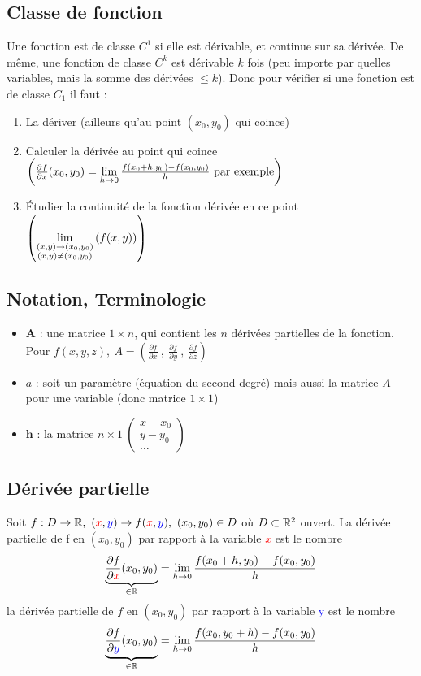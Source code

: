 \documentclass[12pt,a4paper]{article}
\renewcommand{\)}{\right)}
\renewcommand{\(}{\left(}
\begin{document}
\subsection{Classe de fonction}
Une fonction est de classe $C^1$ si elle est dérivable, et continue sur sa dérivée. De même, une fonction de classe $C^k$ est dérivable $k$ fois (peu importe par quelles variables, mais la somme des dérivées $\leq k$). Donc pour vérifier si une fonction est de classe $C_1$ il faut :
\begin{enumerate}
	\item	La dériver (ailleurs qu'au point $(x_0,y_0)$ qui coince)
	\item 	Calculer la dérivée au point qui coince $\(\frac{\partial f}{\partial x}(x_0,y_0) = \limite{h\to 0} \frac{f(x_0+h,y_0) - f(x_0,y_0)}{h}\text{ par exemple}\)$
	\item 	Étudier la continuité de la fonction dérivée en ce point $\(\llimite{(x,y) \to (x_0,y_0)}{(x,y) \neq (x_0,y_0)}{f(x,y)}\)$
\end{enumerate}
\subsection{Notation, Terminologie}
\begin{itemize}
	\item $\textbf{A}$ : une matrice $1\times n$, qui contient les $n$ dérivées partielles de la fonction. Pour $f(x,y,z),\ A = \(\frac{\partial f}{\partial x}\ ,\ \frac{\partial f}{\partial y}\ ,\ \frac{\partial f}{\partial z}\)$
	\item $a$ : soit un paramètre (équation du second degré) mais aussi la matrice $A$ pour une variable (donc matrice $1\times 1$)
	\item $\textbf{h}$ : la matrice $n\times 1\ \begin{pmatrix}
	x-x_0\\
	y-y_0\\
	\ldots
	\end{pmatrix}$
\end{itemize}
\subsection{Dérivée partielle}
\label{deriv_partielle}
Soit $f : D\to \R,\ (\textcolor{red}{x},\textcolor{blue}{y}) \to f(\textcolor{red}{x},\textcolor{blue}{y}),\ (x_0,y_0) \in D$ où $D\subset \mathbb{R}^2$ ouvert. La dérivée partielle de f en $(x_0,y_0)$ par rapport à la variable \textcolor{red}{$x$} est le nombre
\begin{equation*}
\underbrace{\frac{\partial f}{\partial \textcolor{red}{x}} (x_0,y_0)}_{\in \mathbb{R}} = \lim\limits_{h\to 0} \frac{f(x_0+h,y_0) - f(x_0,y_0)}{h}
\end{equation*}
la dérivée partielle de $f$ en $(x_0,y_0)$ par rapport à la variable \textcolor{blue}{y} est le nombre
\begin{equation*}
	\underbrace{\frac{\partial f}{\partial \textcolor{blue}{y}} (x_0,y_0)}_{\in \mathbb{R}} = \lim\limits_{h\to 0} \frac{f(x_0,y_0+h) - f(x_0,y_0)}{h}
\end{equation*}
\end{document}
